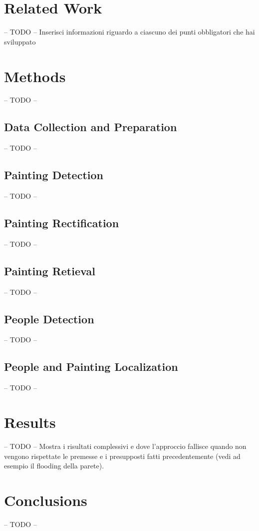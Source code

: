 \documentclass[10pt,twocolumn,letterpaper]{article}
\begin{document}
\section{Related Work}
-- TODO --
Inserisci informazioni riguardo a ciascuno dei punti obbligatori che hai sviluppato

\section{Methods}
-- TODO --
\subsection{Data Collection and Preparation}
-- TODO --
\subsection{Painting Detection}
-- TODO --
\subsection{Painting Rectification}
-- TODO --
\subsection{Painting Retieval}
-- TODO --
\subsection{People Detection}
-- TODO --
\subsection{People and Painting Localization}
-- TODO --

\section{Results}
-- TODO --
Mostra i risultati complessivi e dove l'approccio fallisce quando non vengono rispettate le premesse e i presupposti fatti precedentemente (vedi ad esempio il flooding della parete).

\section{Conclusions}
-- TODO --

{\small


}
\end{document}
